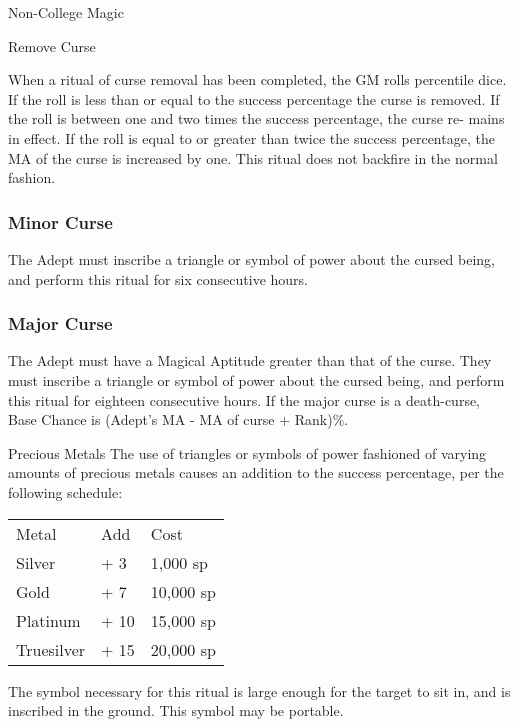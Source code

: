 \begin{Chapter}{Non-College Magic}
\begin{ritual}{Remove Curse}
\begin{effects}
When a ritual of curse removal has been completed, the GM rolls
percentile dice.  If the roll is less than or equal to the success
percentage the curse is removed.  If the roll is between one and two
times the success percentage, the curse re- mains in effect. If the
roll is equal to or greater than twice the success percentage, the MA
of the curse is increased by one. This ritual does not backfire in the
normal fashion.

\subsubsection{Minor Curse}


The Adept must inscribe a triangle or symbol of power about the cursed
being, and perform this ritual for six consecutive hours.

\subsubsection{Major Curse}


The Adept must have a Magical Aptitude greater than that of the
curse. They must inscribe a triangle or symbol of power about the
cursed being, and perform this ritual for eighteen consecutive hours.
If the major curse is a death-curse, Base Chance is (Adept’s MA - MA
of curse + Rank)\%.

Precious Metals The use of triangles or symbols of power fashioned of
varying amounts of precious metals causes an addition to the success
percentage, per the following schedule:

\begin{tabularx}{\columnwidth}{lll}
Metal		& Add	& Cost \\
Silver		& + 3	& 1,000 sp \\
Gold		& + 7	& 10,000 sp \\
Platinum	& + 10	& 15,000 sp \\
Truesilver	& + 15	& 20,000 sp \\
\end{tabularx}

The symbol necessary for this ritual is large enough for the target to
sit in, and is inscribed in the ground. This symbol may be portable.
\end{effects}
\end{ritual}

\end{Chapter}
